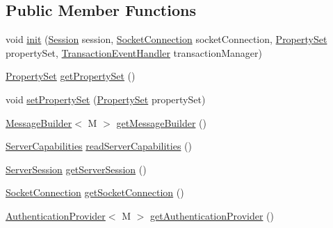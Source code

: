 \subsection*{Public Member Functions}
\begin{DoxyCompactItemize}
\item 
void \mbox{\hyperlink{interfacecom_1_1mysql_1_1cj_1_1protocol_1_1_protocol_a5475394532c7c3ff809b46ee47715bdb}{init}} (\mbox{\hyperlink{interfacecom_1_1mysql_1_1cj_1_1_session}{Session}} session, \mbox{\hyperlink{interfacecom_1_1mysql_1_1cj_1_1protocol_1_1_socket_connection}{Socket\+Connection}} socket\+Connection, \mbox{\hyperlink{interfacecom_1_1mysql_1_1cj_1_1conf_1_1_property_set}{Property\+Set}} property\+Set, \mbox{\hyperlink{interfacecom_1_1mysql_1_1cj_1_1_transaction_event_handler}{Transaction\+Event\+Handler}} transaction\+Manager)
\item 
\mbox{\hyperlink{interfacecom_1_1mysql_1_1cj_1_1conf_1_1_property_set}{Property\+Set}} \mbox{\hyperlink{interfacecom_1_1mysql_1_1cj_1_1protocol_1_1_protocol_a131dda37d8f18893894e2671d4c18005}{get\+Property\+Set}} ()
\item 
void \mbox{\hyperlink{interfacecom_1_1mysql_1_1cj_1_1protocol_1_1_protocol_a870e0a7a79b5248e942b165fe1a9593c}{set\+Property\+Set}} (\mbox{\hyperlink{interfacecom_1_1mysql_1_1cj_1_1conf_1_1_property_set}{Property\+Set}} property\+Set)
\item 
\mbox{\hyperlink{interfacecom_1_1mysql_1_1cj_1_1_message_builder}{Message\+Builder}}$<$ M $>$ \mbox{\hyperlink{interfacecom_1_1mysql_1_1cj_1_1protocol_1_1_protocol_a6a924ac14232063c3eab7b70a376ab29}{get\+Message\+Builder}} ()
\item 
\mbox{\hyperlink{interfacecom_1_1mysql_1_1cj_1_1protocol_1_1_server_capabilities}{Server\+Capabilities}} \mbox{\hyperlink{interfacecom_1_1mysql_1_1cj_1_1protocol_1_1_protocol_ac7608c87247ae3467a9f1e3e8c254042}{read\+Server\+Capabilities}} ()
\item 
\mbox{\hyperlink{interfacecom_1_1mysql_1_1cj_1_1protocol_1_1_server_session}{Server\+Session}} \mbox{\hyperlink{interfacecom_1_1mysql_1_1cj_1_1protocol_1_1_protocol_a1dade0f0b8da9ec87055ff8b86323bd3}{get\+Server\+Session}} ()
\item 
\mbox{\hyperlink{interfacecom_1_1mysql_1_1cj_1_1protocol_1_1_socket_connection}{Socket\+Connection}} \mbox{\hyperlink{interfacecom_1_1mysql_1_1cj_1_1protocol_1_1_protocol_aacade9d5c60b79758ba4d55f6b7d886e}{get\+Socket\+Connection}} ()
\item 
\mbox{\hyperlink{interfacecom_1_1mysql_1_1cj_1_1protocol_1_1_authentication_provider}{Authentication\+Provider}}$<$ M $>$ \mbox{\hyperlink{interfacecom_1_1mysql_1_1cj_1_1protocol_1_1_protocol_a6a80b7350b8911a0894cf7481412af82}{get\+Authentication\+Provider}} ()

\end{DoxyCompactItemize}
